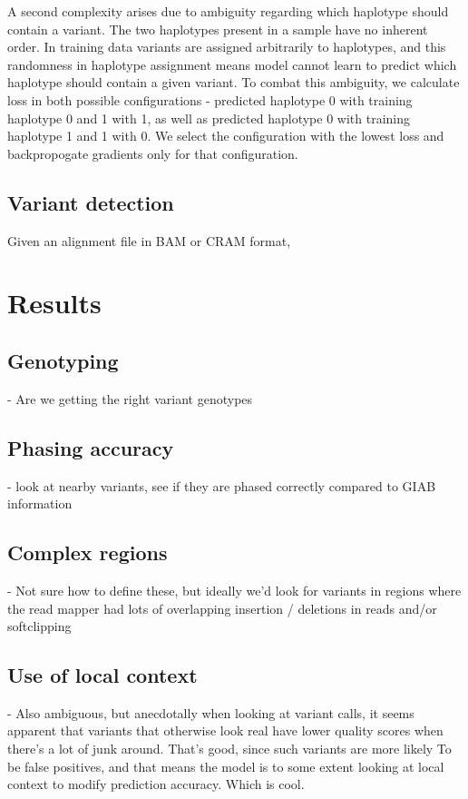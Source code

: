 \documentclass[]{article}
\begin{document}
A second complexity arises due to ambiguity regarding which haplotype should contain a variant. The two haplotypes present in a sample have no inherent order. In training data variants are assigned arbitrarily to haplotypes, and this randomness in haplotype assignment means model cannot learn to predict which haplotype should contain a given variant. To combat this ambiguity, we calculate loss in both possible configurations - predicted haplotype 0 with training haplotype 0 and 1 with 1, as well as predicted haplotype 0 with training haplotype 1 and 1 with 0. We select the configuration with the lowest loss and backpropogate gradients only for that configuration. 


\subsection{Variant detection}

Given an alignment file in BAM or CRAM format, 

\section{Results}

\subsection{Genotyping}
 - Are we getting the right variant genotypes

\subsection{Phasing accuracy}
 - look at nearby variants, see if they are phased correctly compared to GIAB information

\subsection{Complex regions}
 - Not sure how to define these, but ideally we'd look for variants in regions where the read mapper had
 lots of overlapping insertion / deletions in reads and/or softclipping

\subsection{Use of local context}
 - Also ambiguous, but anecdotally when looking at variant calls, it seems apparent that variants that otherwise look real have lower quality scores when there's a lot of junk around. That's good, since such variants are more likely To
 be false positives, and that means the model is to some extent looking at local context to modify prediction accuracy. Which is cool. 
\end{document}
